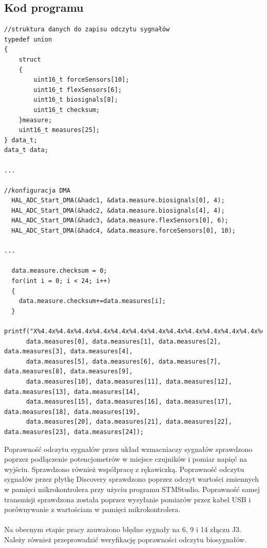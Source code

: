 ﻿\documentclass{article}
\begin{document}
\subsection{Kod programu}
\begin{verbatim}
//struktura danych do zapisu odczytu sygnałów
typedef union
{
	struct
	{
		uint16_t forceSensors[10];
		uint16_t flexSensors[6];
		uint16_t biosignals[8];
		uint16_t checksum;
	}measure;
	uint16_t measures[25];
} data_t;
data_t data;

...

//konfiguracja DMA
  HAL_ADC_Start_DMA(&hadc1, &data.measure.biosignals[0], 4);
  HAL_ADC_Start_DMA(&hadc2, &data.measure.biosignals[4], 4);
  HAL_ADC_Start_DMA(&hadc3, &data.measure.flexSensors[0], 6);
  HAL_ADC_Start_DMA(&hadc4, &data.measure.forceSensors[0], 10);

...

  data.measure.checksum = 0;
  for(int i = 0; i < 24; i++)
  {
    data.measure.checksum+=data.measures[i];
  }
  printf("X%4.4x%4.4x%4.4x%4.4x%4.4x%4.4x%4.4x%4.4x%4.4x%4.4x%4.4x%4.4x%4.4x%4.4x%4.4x%4.4x%4.4x%4.4x%4.4x%4.4x%4.4x%4.4x%4.4x%4.4x%4.4x\r\n",
	  data.measures[0], data.measures[1], data.measures[2], data.measures[3], data.measures[4],
	  data.measures[5], data.measures[6], data.measures[7], data.measures[8], data.measures[9],
	  data.measures[10], data.measures[11], data.measures[12], data.measures[13], data.measures[14],
	  data.measures[15], data.measures[16], data.measures[17], data.measures[18], data.measures[19],
	  data.measures[20], data.measures[21], data.measures[22], data.measures[23], data.measures[24]);
\end{verbatim}

Poprawność odczytu sygnałów przez układ wzmacniaczy sygnałów sprawdzono poprzez podłączenie potencjometrów w miejsce czujników i pomiar napięć na wyjściu. Sprawdzono również współpracę z rękawiczką. 
Poprawność odczytu sygnałów przez płytkę Discovery sprawdzono poprzez odczyt wartości zmiennych w pamięci mikrokontrolera przy użyciu programu STMStudio.
Poprawność samej transmisji sprawdzona została poprzez wysyłanie pomiarów przez kabel USB i porównywanie z wartościam w pamięci mikrokontrolera.\\
\\
Na obecnym etapie pracy zauważono błędne sygnały na 6, 9 i 14 złączu J3.\\
Należy również przeprowadzić weryfikację poprawności odczytu biosygnałów.
\end{document}
